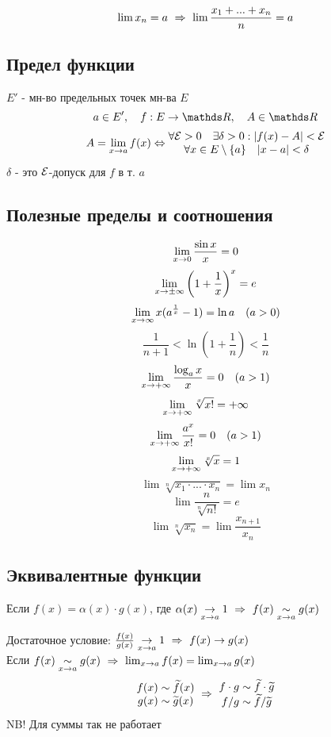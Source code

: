 \documentclass[main]{subfiles}
\begin{document}
    \begin{Utv}
        \[\lim x_n = a \ \Rightarrow\  \lim \frac{x_1 + ... + x_n}{n} = a\]
    \end{Utv}

    \subsection{Предел функции}
    \begin{definition}
        $E'$ - мн-во предельных точек мн-ва $E$
        \[a \in E',\q f: E \ra \R,\q A \in \R\]
        \[A = \lim_{x \rightarrow a} f(x) \Leftrightarrow \begin{matrix}
            \forall \mathcal{E} > 0 \quad \exists \delta>0: |f(x) - A| < \mathcal{E}\\
            \forall x \in E \setminus \{a\} \quad |x-a| < \delta
        \end{matrix}\]
        $\delta$ - это $\mathcal{E}$-допуск для $f$ в т. $a$
    \end{definition}

    \subsection{Полезные пределы и соотношения}
    \[\lim_{x \rightarrow 0} \frac{\sin x}{x} = 0\]
    \[\lim_{x \rightarrow \pm \infty} \left(1 + \frac{1}{x}\right)^x = e\]
    \[\lim_{x \rightarrow \infty} x (a^{\frac{1}{x}}-1) = \ln a \quad (a > 0)\]
    \[\frac{1}{n+1} < \ln(1 + \frac{1}{n}) < \frac{1}{n}\]
    \[\lim_{x \rightarrow +\infty} \frac{\log_a x}{x} = 0 \quad (a > 1)\]
    \[\lim_{x \rightarrow +\infty} \sqrt[x]{x!} = +\infty\]
    \[\lim_{x \rightarrow +\infty} \frac{a^x}{x!} = 0 \quad (a > 1)\]
    \[\lim_{x \rightarrow +\infty} \sqrt[x]{x} = 1\]
    \[\lim \sqrt[n]{x_1 \cdot ... \cdot x_n} = \lim x_n\]
    \[\lim \frac{n}{\sqrt[n]{n!}} = e\]
    \[\lim \sqrt[n]{x_n} = \lim \frac{x_{n+1}}{x_n}\]

    \subsection{Эквивалентные функции}
    \begin{definition}
        Если $f(x) = \alpha(x) \cdot g(x)$, где $\alpha(x) \underset{x \rightarrow a}{\rightarrow} 1 \ \Rightarrow\  f(x) \underset{x \rightarrow a}{\sim} g(x)$\\
    \end{definition}

    \begin{remark}
      Достаточное условие: $\frac{f(x)}{g(x)} \underset{x \rightarrow a}{\rightarrow} 1 \ \Rightarrow\  f(x) \rightarrow g(x)$\\
      Если $f(x) \underset{x \rightarrow a}{\sim} g(x) \ \Rightarrow\  \lim_{x \rightarrow a} f(x) = \lim_{x \rightarrow a} g(x)$
      \[\begin{matrix}
        f(x) \sim \widetilde{f}(x)\\
        g(x) \sim \widetilde{g}(x)
      \end{matrix} \ \Rightarrow\  \begin{matrix}
        f \cdot g \sim \widetilde{f} \cdot \widetilde{g}\\
        f / g \sim \widetilde{f} / \widetilde{g}
      \end{matrix}\]
      NB! Для суммы так не работает
    \end{remark}
\end{document}
